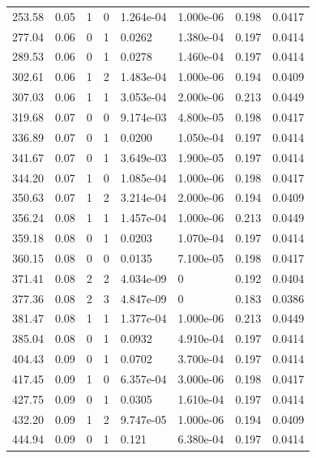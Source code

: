 \documentclass[preview]{standalone}
\begin{document}
{{\begin{tabular}{L{1.2cm}C{1.2cm} C{0.3cm}C{0.5cm} C{1.4cm}C{1.4cm} C{1.4cm}C{1.4cm}}
  253.58  &  0.05  & 1     &  0 &  1.264e-04  & 1.000e-06  & 0.198 &  0.0417   \\ 
  277.04  &  0.06  & 0     &  1 &  0.0262  & 1.380e-04  & 0.197 &  0.0414   \\ 
  289.53  &  0.06  & 0     &  1 &  0.0278  & 1.460e-04  & 0.197 &  0.0414   \\ 
  302.61  &  0.06  & 1     &  2 &  1.483e-04  & 1.000e-06  & 0.194 &  0.0409   \\ 
  307.03  &  0.06  & 1     &  1 &  3.053e-04  & 2.000e-06  & 0.213 &  0.0449   \\ 
  319.68  &  0.07  & 0     &  0 &  9.174e-03  & 4.800e-05  & 0.198 &  0.0417   \\ 
  336.89  &  0.07  & 0     &  1 &  0.0200  & 1.050e-04  & 0.197 &  0.0414   \\ 
  341.67  &  0.07  & 0     &  1 &  3.649e-03  & 1.900e-05  & 0.197 &  0.0414   \\ 
  344.20  &  0.07  & 1     &  0 &  1.085e-04  & 1.000e-06  & 0.198 &  0.0417   \\ 
  350.63  &  0.07  & 1     &  2 &  3.214e-04  & 2.000e-06  & 0.194 &  0.0409   \\ 
  356.24  &  0.08  & 1     &  1 &  1.457e-04  & 1.000e-06  & 0.213 &  0.0449   \\ 
  359.18  &  0.08  & 0     &  1 &  0.0203  & 1.070e-04  & 0.197 &  0.0414   \\ 
  360.15  &  0.08  & 0     &  0 &  0.0135  & 7.100e-05  & 0.198 &  0.0417   \\ 
  371.41  &  0.08  & 2     &  2 &  4.034e-09  & 0  & 0.192 &  0.0404   \\ 
  377.36  &  0.08  & 2     &  3 &  4.847e-09  & 0  & 0.183 &  0.0386   \\ 
  381.47  &  0.08  & 1     &  1 &  1.377e-04  & 1.000e-06  & 0.213 &  0.0449   \\ 
  385.04  &  0.08  & 0     &  1 &  0.0932  & 4.910e-04  & 0.197 &  0.0414   \\ 
  404.43  &  0.09  & 0     &  1 &  0.0702  & 3.700e-04  & 0.197 &  0.0414   \\ 
  417.45  &  0.09  & 1     &  0 &  6.357e-04  & 3.000e-06  & 0.198 &  0.0417   \\ 
  427.75  &  0.09  & 0     &  1 &  0.0305  & 1.610e-04  & 0.197 &  0.0414   \\ 
  432.20  &  0.09  & 1     &  2 &  9.747e-05  & 1.000e-06  & 0.194 &  0.0409   \\ 
  444.94  &  0.09  & 0     &  1 &  0.121  & 6.380e-04  & 0.197 &  0.0414   \\ 

\end{tabular}}}
\end{document}
